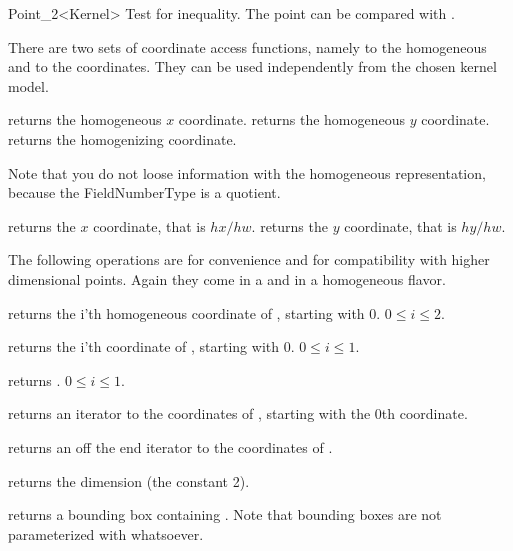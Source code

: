 \begin{ccRefClass} {Point_2<Kernel>}
       {Test for inequality. The point can be compared with .}

There are two sets of coordinate access functions, namely to the
homogeneous and to the  coordinates. They can be used
independently from the chosen kernel model.

       {returns the homogeneous $x$ coordinate.}
\ccGlue
{}
       {returns the homogeneous $y$ coordinate.}
\ccGlue
{}
       {returns the homogenizing  coordinate.}
       
Note that you do not loose information with the homogeneous
representation, because the FieldNumberType is a quotient.

       {returns the  $x$ coordinate, that is $hx/hw$.}
\ccGlue
{}
       {returns the  $y$ coordinate, that is $hy/hw$.}
       
The following operations are for convenience and for compatibility
with higher dimensional points. Again they come in a
 and in a homogeneous flavor.

       {returns the i'th homogeneous coordinate of \ccVar, starting with 0.
        \ccPrecond $0\leq i \leq 2$.}

       {returns the i'th  coordinate of \ccVar, starting with 0.
        \ccPrecond $0\leq i \leq 1$.}


       {returns .
        \ccPrecond $0\leq i \leq 1$.}

       {returns an iterator to the  coordinates 
        of \ccVar, starting with the 0th coordinate.}

       {returns an off the end iterator to the  
        coordinates of \ccVar.}

       {returns the dimension (the constant 2).}

       {returns a bounding box containing \ccVar. Note that bounding boxes
        are not parameterized with whatsoever. }


\end{ccRefClass}

